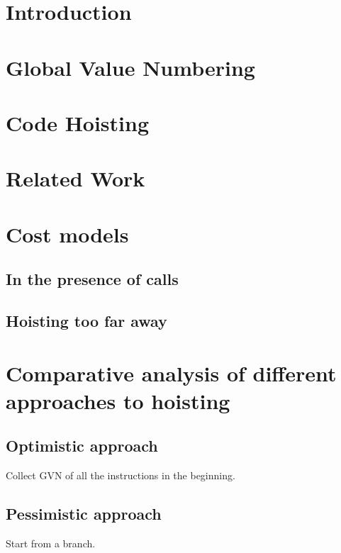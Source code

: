 \section{Introduction}

\section{Global Value Numbering}
\section{Code Hoisting}
\section{Related Work}

\section{Cost models}
\subsection{In the presence of calls}
\subsection{Hoisting too far away}

\section{Comparative analysis of different approaches to hoisting}
\subsection{Optimistic approach}
Collect GVN of all the instructions in the beginning.
\subsection{Pessimistic approach}
Start from a branch.


